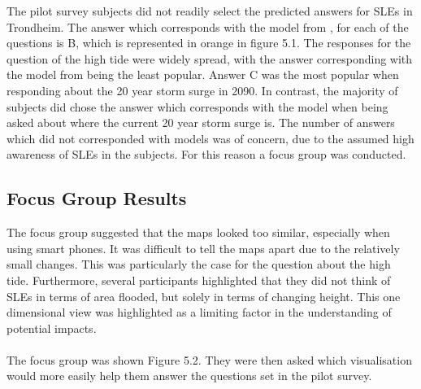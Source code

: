The pilot survey subjects did not readily select the predicted answers for SLEs in Trondheim. The answer which corresponds with the model from \cite{kartverket_se_2020}, for each of the questions is B, which is represented in orange in figure 5.1. The responses for the question of the high tide were widely spread, with the answer corresponding with the model from \cite{kartverket_se_2020} being the least popular.  Answer C was the most popular when responding about the 20 year storm surge in 2090. In contrast, the majority of subjects did chose the answer which corresponds with the model when being asked about where the current 20 year storm surge is. The number of answers which did not corresponded with \cite{kartverket_se_2020} models was of concern, due to the assumed high awareness of SLEs in the subjects. For this reason a focus group was conducted. 
\paragraph{}


\subsection{Focus Group Results}
  The focus group suggested that the maps looked too similar, especially when using smart phones. It was difficult to tell the maps apart due to the relatively small changes. This was particularly the case for the question about the high tide. Furthermore, several participants highlighted that they did not think of SLEs in terms of area flooded, but solely in terms of changing height. This one dimensional view was highlighted as a limiting factor in the understanding of potential impacts. 
\paragraph{}

The focus group was shown Figure 5.2. They were then asked which visualisation would more easily help them answer the questions set in the pilot survey.
\paragraph{}


